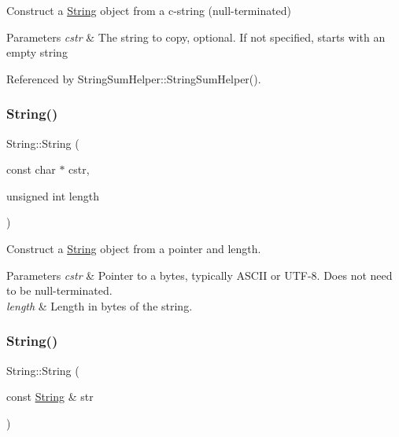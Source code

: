 Construct a \hyperlink{class_string}{String} object from a c-\/string (null-\/terminated) 


\begin{DoxyParams}{Parameters}
{\em cstr} & The string to copy, optional. If not specified, starts with an empty string \\
\hline
\end{DoxyParams}


Referenced by String\+Sum\+Helper\+::\+String\+Sum\+Helper().

\mbox{\label{class_string_a20cfefac6f5b37f40dcb35826b563a5a}} 
\subsubsection{\texorpdfstring{String()}{String()}\hspace{0.1cm}{\footnotesize\ttfamily [2/13]}}
{\footnotesize\ttfamily String\+::\+String (\begin{DoxyParamCaption}\item[{const char $\ast$}]{cstr,  }\item[{unsigned int}]{length }\end{DoxyParamCaption})}



Construct a \hyperlink{class_string}{String} object from a pointer and length. 


\begin{DoxyParams}{Parameters}
{\em cstr} & Pointer to a bytes, typically A\+S\+C\+II or U\+T\+F-\/8. Does not need to be null-\/terminated.\\
\hline
{\em length} & Length in bytes of the string. \\
\hline
\end{DoxyParams}
\mbox{\label{class_string_a5774bcd4a4c232a8aec5a3ec6d01a157}} 
\subsubsection{\texorpdfstring{String()}{String()}\hspace{0.1cm}{\footnotesize\ttfamily [3/13]}}
{\footnotesize\ttfamily String\+::\+String (\begin{DoxyParamCaption}\item[{const \hyperlink{class_string}{String} \&}]{str }\end{DoxyParamCaption})}



